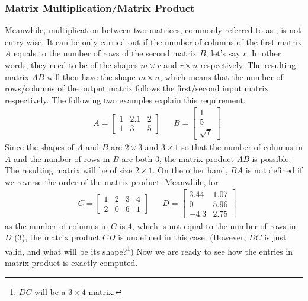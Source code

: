 \subsubsection{Matrix Multiplication/Matrix Product} Meanwhile, multiplication between two matrices, commonly referred to as , is not entry-wise. It can be only carried out if the number of columns of the first matrix $A$ equals to the number of rows of the second matrix $B$, let's say $r$. In other words, they need to be of the shapes $m \times r$ and $r \times n$ respectively. The resulting matrix $AB$ will then have the shape $m \times n$, which means that the number of rows/columns of the output matrix follows the first/second input matrix respectively. The following two examples explain this requirement.
\begin{align*}
& A = 
\begin{bmatrix}
1 & 2.1 & 2 \\
1 & 3 & 5
\end{bmatrix} &
& B = 
\begin{bmatrix}
1 \\
5 \\
\sqrt{7} 
\end{bmatrix}
\end{align*}
Since the shapes of $A$ and $B$ are $2 \times 3$ and $3 \times 1$ so that the number of columns in $A$ and the number of rows in $B$ are both $3$, the matrix product $AB$ is possible. The resulting matrix will be of size $2 \times 1$. On the other hand, $BA$ is not defined if we reverse the order of the matrix product. Meanwhile, for
\begin{align*}
& C = 
\begin{bmatrix}
1 & 2 & 3 & 4 \\
2 & 0 & 6 & 1
\end{bmatrix} &
& D = 
\begin{bmatrix}
3.44 & 1.07\\
0 & 5.96\\
-4.3 & 2.75
\end{bmatrix}
\end{align*}
as the number of columns in $C$ is $4$, which is not equal to the number of rows in $D$ ($3$), the matrix product $CD$ is undefined in this case. (However, $DC$ is just valid, and what will be its shape?\footnote{$DC$ will be a $3 \times 4$ matrix.}) Now we are ready to see how the entries in matrix product is exactly computed.

